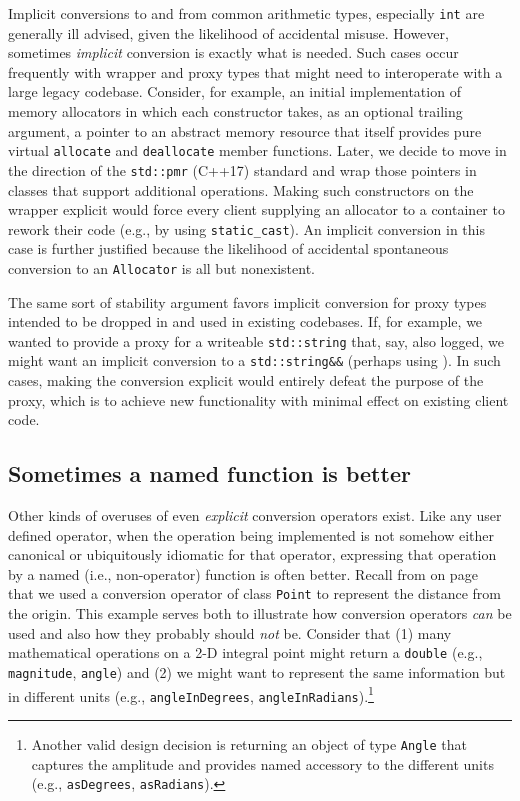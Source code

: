 Implicit conversions to and from common arithmetic types, especially
\texttt{int} are generally ill advised, given the likelihood of
accidental misuse. However, sometimes \emph{implicit}
conversion is exactly what is needed. Such cases occur frequently with
wrapper and proxy types that might need to interoperate with a large
legacy codebase. Consider, for example, an initial implementation of
memory allocators in which each constructor takes, as an optional
trailing argument, a pointer to an abstract memory resource that itself
provides pure virtual \texttt{allocate} and \texttt{deallocate} member
functions. Later, we decide to move in the direction of the
\texttt{std::pmr} (C++17) standard and wrap those pointers in classes
that support additional operations. Making such constructors on the
wrapper explicit would force every client supplying an allocator to a
container to rework their code (e.g., by using \texttt{static\_cast}).
An implicit conversion in this case is further justified because the
likelihood of accidental spontaneous conversion to an \texttt{Allocator}
is all but nonexistent.

The same sort of stability argument favors implicit conversion for proxy
types intended to be dropped in and used in existing codebases. If, for
example, we wanted to provide a proxy for a writeable
\texttt{std::string} that, say, also logged, we might want an implicit
conversion to a \texttt{std::string\&\&} (perhaps using
{}). In such cases, making the
conversion explicit would entirely defeat the purpose of the proxy,
which is to achieve new functionality with minimal effect on existing
client code.

\subsection[Sometimes a named function is better]{Sometimes a named function is better}\label{sometimes-a-named-function-is-better}

Other kinds of overuses of even \emph{explicit} conversion
operators exist. Like any user defined operator, when the operation being
implemented is not somehow either canonical or ubiquitously idiomatic
for that operator, expressing that operation by a
named (i.e., non-operator) function is often better. Recall from
{\it{}} on page~\pageref{description-explicitconv} that we used a conversion operator of
class \texttt{Point} to represent the distance from the origin. This
example serves both to illustrate how conversion operators \emph{can} be
used and also how they probably should \emph{not} be. Consider that (1)
many mathematical operations on a 2-D integral point might return a \texttt{double} (e.g., \texttt{magnitude},
\texttt{angle}) and (2) we might want to represent the same
information but in different units (e.g., \texttt{angleInDegrees},
\texttt{angleInRadians}).{\cprotect\footnote{Another valid design
decision is returning an object of type \texttt{Angle} that captures
the amplitude and provides named accessory to the different units
  (e.g., \texttt{asDegrees}, \texttt{asRadians}).}}

